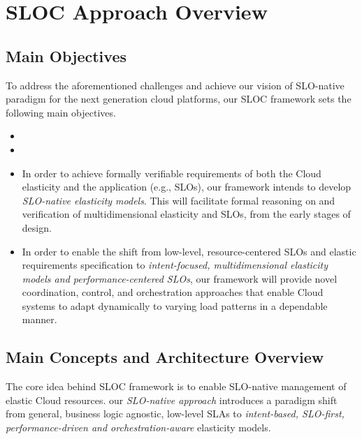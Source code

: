 \section{SLOC Approach Overview}
\label{sec:Approach}

\subsection{Main Objectives} 
To address the aforementioned challenges and 
achieve our vision of SLO-native paradigm for the next generation cloud
platforms, our SLOC framework sets the following main objectives.

\begin{itemize}
	\item {} 
	\item {}
	\item In order to achieve formally verifiable requirements of both the Cloud 
elasticity and the application (e.g., SLOs), our framework intends to develop 
{\em SLO-native elasticity models}. This will facilitate formal reasoning on and 
verification of multidimensional elasticity and SLOs, from the early stages 
of design. 
\item In order to enable the shift from low-level, resource-centered SLOs 
and elastic requirements specification to {\em intent-focused, 
multidimensional elasticity models and performance-centered SLOs}, 
our framework will provide novel 
coordination, control, and orchestration approaches that enable Cloud systems 
to adapt dynamically to varying load patterns in a dependable manner.
\end{itemize}

\subsection{Main Concepts and Architecture Overview}
The core idea behind SLOC framework is to enable SLO-native management of 
elastic Cloud resources. 
 our {\em SLO-native approach} introduces a 
paradigm shift from general, business logic agnostic, low-level SLAs to  
{\em intent-based, SLO-first, performance-driven and orchestration-aware} 
elasticity models.

